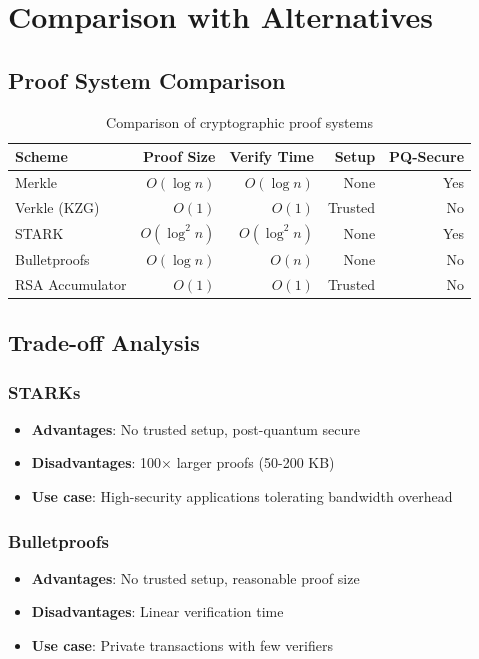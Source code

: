 \section{Comparison with Alternatives}


\subsection{Proof System Comparison}

\begin{table}[H]
\centering
\begin{tabular}{@{}lrrrr@{}}
\toprule
\textbf{Scheme} & \textbf{Proof Size} & \textbf{Verify Time} & \textbf{Setup} & \textbf{PQ-Secure} \\
\midrule
Merkle & $O(\log n)$ & $O(\log n)$ & None & Yes \\
Verkle (KZG) & $O(1)$ & $O(1)$ & Trusted & No \\
STARK & $O(\log^2 n)$ & $O(\log^2 n)$ & None & Yes \\
Bulletproofs & $O(\log n)$ & $O(n)$ & None & No \\
RSA Accumulator & $O(1)$ & $O(1)$ & Trusted & No \\
\bottomrule
\end{tabular}
\caption{Comparison of cryptographic proof systems}
\label{tab:proof-comparison}
\end{table}

\subsection{Trade-off Analysis}

\subsubsection{STARKs}
\begin{itemize}
    \item \textbf{Advantages}: No trusted setup, post-quantum secure
    \item \textbf{Disadvantages}: 100× larger proofs (50-200 KB)
    \item \textbf{Use case}: High-security applications tolerating bandwidth overhead
\end{itemize}

\subsubsection{Bulletproofs}
\begin{itemize}
    \item \textbf{Advantages}: No trusted setup, reasonable proof size
    \item \textbf{Disadvantages}: Linear verification time
    \item \textbf{Use case}: Private transactions with few verifiers
\end{itemize}

